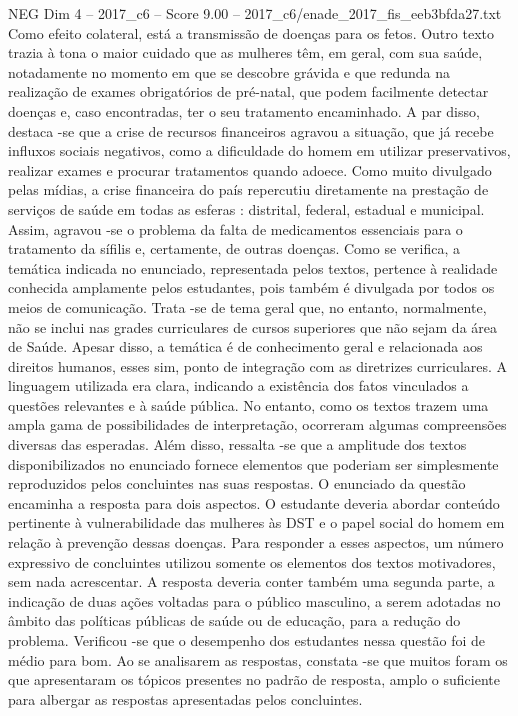 \begin{textsample}{NEG Dim 4 – 2017\_c6 – Score 9.00 – 2017\_c6/enade\_2017\_fis\_eeb3bfda27.txt}
Como efeito colateral, está a transmissão de doenças para os fetos.
Outro texto trazia à tona o maior cuidado que as mulheres têm, em geral, com sua saúde, notadamente no momento em que se descobre grávida e que redunda na realização de exames obrigatórios de pré-natal, que podem facilmente detectar doenças e, caso encontradas, ter o seu tratamento encaminhado.
A par disso, destaca -se que a crise de recursos financeiros agravou a situação, que já recebe influxos sociais negativos, como a dificuldade do homem em utilizar preservativos, realizar exames e procurar tratamentos quando adoece.
Como muito divulgado pelas mídias, a crise financeira do país repercutiu diretamente na prestação de serviços de saúde em todas as esferas : distrital, federal, estadual e municipal.
Assim, agravou -se o problema da falta de medicamentos essenciais para o tratamento da sífilis e, certamente, de outras doenças.
Como se verifica, a temática indicada no enunciado, representada pelos textos, pertence à realidade conhecida amplamente pelos estudantes, pois também é divulgada por todos os meios de comunicação.
Trata -se de tema geral que, no entanto, normalmente, não se inclui nas grades curriculares de cursos superiores que não sejam da área de Saúde.
Apesar disso, a temática é de conhecimento geral e relacionada aos direitos humanos, esses sim, ponto de integração com as diretrizes curriculares.
A linguagem utilizada era clara, indicando a existência dos fatos vinculados a questões relevantes e à saúde pública.
No entanto, como os textos trazem uma ampla gama de possibilidades de interpretação, ocorreram algumas compreensões diversas das esperadas.
Além disso, ressalta -se que a amplitude dos textos disponibilizados no enunciado fornece elementos que poderiam ser simplesmente reproduzidos pelos concluintes nas suas respostas.
O enunciado da questão encaminha a resposta para dois aspectos.
O estudante deveria abordar conteúdo pertinente à vulnerabilidade das mulheres às DST e o papel social do homem em relação à prevenção dessas doenças.
Para responder a esses aspectos, um número expressivo de concluintes utilizou somente os elementos dos textos motivadores, sem nada acrescentar.
A resposta deveria conter também uma segunda parte, a indicação de duas ações voltadas para o público masculino, a serem adotadas no âmbito das políticas públicas de saúde ou de educação, para a redução do problema.
Verificou -se que o desempenho dos estudantes nessa questão foi de médio para bom.
Ao se analisarem as respostas, constata -se que muitos foram os que apresentaram os tópicos presentes no padrão de resposta, amplo o suficiente para albergar as respostas apresentadas pelos concluintes.

\end{textsample}
